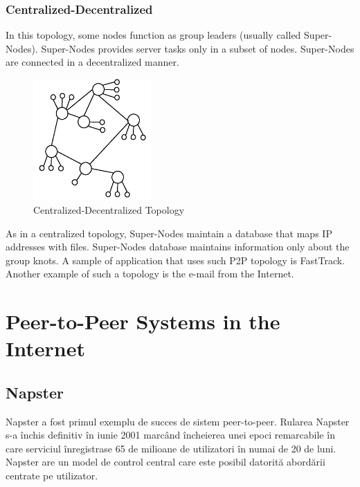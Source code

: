 \subsubsection{Centralized-Decentralized}

In this topology, some nodes function as group leaders (usually called
Super-Nodes). Super-Nodes provides server tasks only in a subset of nodes.
Super-Nodes are connected in a decentralized manner.

\begin{figure}
  \centering
  \includegraphics[width=0.4\textwidth]{src/img/p2p-systems/centralized-decentralized}
  \caption{Centralized-Decentralized Topology}
  \label{fig:p2p-systems:centralized-decentralized}
\end{figure}

As in a centralized topology, Super-Nodes maintain a database that maps IP
addresses with files. Super-Nodes database maintains information only about
the group knots. A sample of application that uses such P2P topology is
FastTrack. Another example of such a topology is the e-mail from the Internet.

\section{Peer-to-Peer Systems in the Internet}
\label{sec:p2p-systems:p2p-internet}

\subsection{Napster}

Napster a fost primul exemplu de succes de sistem peer-to-peer. Rularea
Napster s-a închis definitiv în iunie 2001 marcând încheierea unei epoci
remarcabile în care serviciul înregistrase 65 de milioane de utilizatori în
numai de 20 de luni. Napster are un model de control central care este posibil
datorită abordării centrate pe utilizator.

